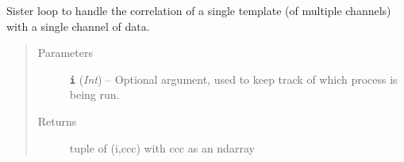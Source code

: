 \documentclass[a4paper,10pt,english]{sphinxmanual}
\begin{document}

\begin{fulllineitems}
\label{core:match_filter._template_loop}
Sister loop to handle the correlation of a single template (of multiple
channels) with a single channel of data.
\begin{quote}\begin{description}
\item[{Parameters}] \leavevmode
\textbf{\texttt{i}} (\emph{Int}) -- Optional argument, used to keep track of which process is being    run.

\item[{Returns}] \leavevmode
tuple of (i,ccc) with ccc as an ndarray

\end{description}\end{quote}

\end{fulllineitems}

\end{document}
